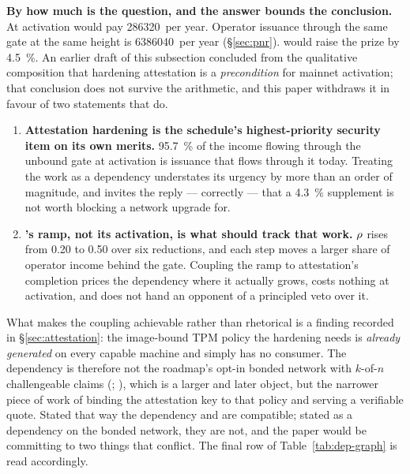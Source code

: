 \textbf{By how much is the question, and the answer bounds the conclusion.} At activation \PNR would
pay \num{286320}\flux\ per year. Operator issuance through the same gate at the same height is
\num{6386040}\flux\ per year (\S\ref{sec:pnr}). \PNR would raise the prize by \SI{4.5}{\percent}. An
earlier draft of this subsection concluded from the qualitative composition that hardening attestation
is a \emph{precondition} for \PNR mainnet activation; that conclusion does not survive the
arithmetic, and this paper withdraws it in favour of two statements that do.

\begin{enumerate}
  \item \textbf{Attestation hardening is the schedule's highest-priority security item on its own
  merits.} \SI{95.7}{\percent} of the income flowing through the unbound gate at activation is
  issuance that flows through it today. Treating the work as a \PNR dependency understates its
  urgency by more than an order of magnitude, and invites the reply --- correctly --- that a
  \SI{4.3}{\percent} supplement is not worth blocking a network upgrade for.
  \item \textbf{\PNR's ramp, not its activation, is what should track that work.} $\rho$ rises
  from \num{0.20} to \num{0.50} over six reductions, and each step moves a larger share of operator
  income behind the gate. Coupling the ramp to attestation's completion prices the dependency where
  it actually grows, costs nothing at activation, and does not hand an opponent of \PNR a principled
  veto over it.
\end{enumerate}

What makes the coupling achievable rather than rhetorical is a finding recorded in
\S\ref{sec:attestation}: the image-bound TPM policy the hardening needs is \emph{already generated} on
every capable machine and simply has no consumer. The dependency is therefore not the roadmap's
opt-in bonded network with $k$-of-$n$ challengeable claims (\planned;
), which is a larger and later object, but the narrower
piece of work of binding the attestation key to that policy and serving a verifiable quote. Stated
that way the dependency and  are compatible; stated as a
dependency on the bonded network, they are not, and the paper would be committing to two things that
conflict. The final row of Table~\ref{tab:dep-graph} is read accordingly.

